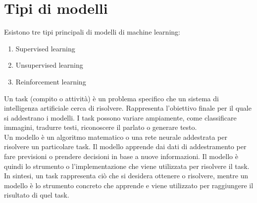 \documentclass[
	a4paper,
	11pt,
	oneside
]{book}
\theoremstyle{std}
\begin{document}
	\section{Tipi di modelli}
	Esistono tre tipi principali di modelli di machine learning:
	\begin{enumerate}
		\item Supervised learning
		\item Unsupervised learning
		\item Reinforcement learning
	\end{enumerate}
	\begin{definition}
		Un task (compito o attività) è un problema specifico che un sistema di intelligenza artificiale cerca di risolvere. Rappresenta l'obiettivo finale per il quale si addestrano i modelli. I task possono variare ampiamente, come classificare immagini, tradurre testi, riconoscere il parlato o generare testo. \\
		Un modello è un algoritmo matematico o una rete neurale addestrata per risolvere un particolare task. Il modello apprende dai dati di addestramento per fare previsioni o prendere decisioni in base a nuove informazioni. Il modello è quindi lo strumento o l'implementazione che viene utilizzata per risolvere il task. \\
		In sintesi, un task rappresenta ciò che si desidera ottenere o risolvere, mentre un modello è lo strumento concreto che apprende e viene utilizzato per raggiungere il risultato di quel task.
	\end{definition}
	
\end{document}
